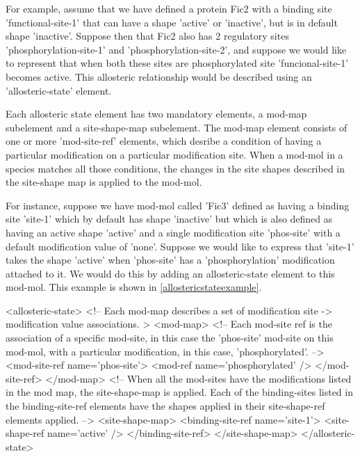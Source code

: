 For example, assume that we have defined a protein Fic2 with a binding
site 'functional-site-1' that can have a shape 'active' or 'inactive',
but is in default shape 'inactive'.  Suppose then that Fic2 also has 2
regulatory sites 'phosphorylation-site-1' and
'phosphorylation-site-2', and suppose we would like to represent that
when both these sites are phosphorylated site 'funcional-site-1'
becomes active.  This allosteric relationship would be described using
an 'allosteric-state' element.

Each allosteric state element has two mandatory elements, a mod-map
subelement and a site-shape-map subelement.  The mod-map element
consists of one or more 'mod-site-ref' elements, which desribe a
condition of having a particular modification on a particular
modification site.  When a mod-mol in a species matches all those
conditions, the changes in the site shapes described in the site-shape
map is applied to the mod-mol.

For instance, suppose we have mod-mol called 'Fic3' defined as having
a binding site 'site-1' which by default has shape 'inactive' but
which is also defined as having an active shape 'active' and a single
modification site 'phos-site' with a default modification value of
'none'.  Suppose we would like to express that 'site-1' takes the
shape 'active' when 'phos-site' has a 'phosphorylation' modification
attached to it.  We would do this by adding an allosteric-state
element to this mod-mol.  This example is shown in
\ref{allostericstateexample}. 

\begin{ExampleXML}[caption=An example of an allosteric-state element, label=allostericstateexample, showspaces=false]
<allosteric-state>
  <!-- Each mod-map describes a set of modification site -> modification
       value associations. >
  <mod-map>
    <!-- Each mod-site ref is the association of a specific mod-site,
         in this case the 'phos-site' mod-site on this mod-mol, with a
         particular modification, in this case, 'phosphorylated'. -->
    <mod-site-ref name='phos-site'>
      <mod-ref name='phosphorylated' />
    </mod-site-ref>
  </mod-map>
  <!-- When all the mod-sites have the modifications listed in the mod
       map, the site-shape-map is applied.  Each of the binding-sites
       listed in the binding-site-ref elements have the shapes applied
       in their site-shape-ref elements applied. -->
  <site-shape-map>
    <binding-site-ref name='site-1'>
      <site-shape-ref name='active' />
    </binding-site-ref>
  </site-shape-map>
</allosteric-state>
\end{ExampleXML}

